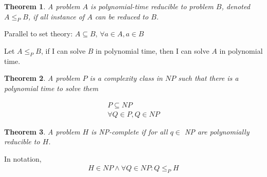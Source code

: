 \documentclass{article}
\theoremstyle{plain}
\newtheorem{thm}{Theorem}
\theoremstyle{definition}
\begin{document}
\begin{thm}
    A problem $A$ is polynomial-time reducible to problem $B$, denoted $A\leq_P B$,
    if all instance of $A$ can be reduced to $B$.
\end{thm}

Parallel to set theory: $A\subseteq B$, $\forall a\in A, a\in B$

Let $A\leq_P B$, if I can solve $B$ in polynomial time, then I can solve $A$ in polynomial
time.


\begin{thm}
    A problem $P$ is a complexity class in $NP$ such that there is a polynomial time to
    solve them
\end{thm}

\begin{gather*}
    P\subseteq NP\\
    \forall Q\in P, Q\in NP
\end{gather*}


\begin{thm}
    A problem $H$ is NP-complete if for all $q\in$ NP are polynomially reducible to
    $H$.
\end{thm}

In notation,
\begin{gather*}
    H\in NP \land \forall Q\in NP: Q\leq_P H\\
\end{gather*}
\end{document}
